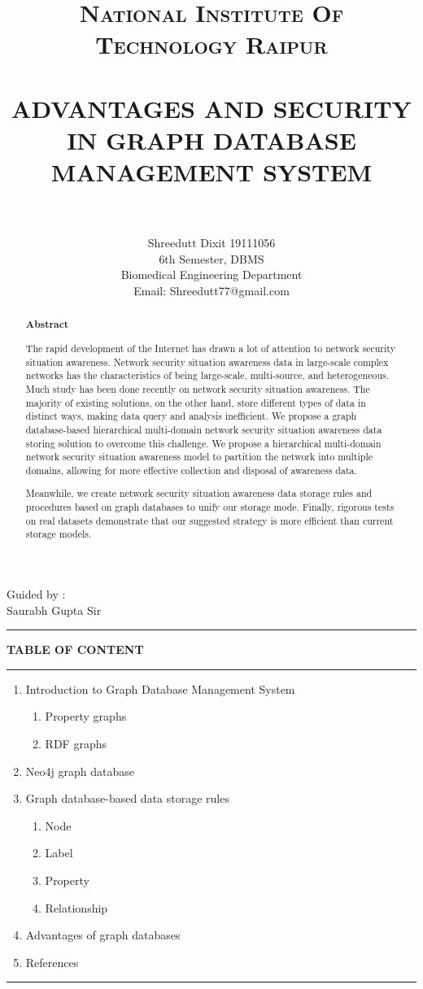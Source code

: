\documentclass[paper=a4, fontsize=11pt]{scrartcl}
\title{
		\usefont{OT1}{bch}{b}{n}
		\normalfont \normalsize \textsc{National Institute Of Technology Raipur} \\ [25pt]
		\horrule{0.5pt} \\[0.4cm]
		\huge ADVANTAGES AND SECURITY IN GRAPH DATABASE MANAGEMENT SYSTEM  \\
		\horrule{2pt} \\[0.5cm]
}
\author{
        Shreedutt Dixit 19111056\\6th Semester, 
        DBMS\\ Biomedical Engineering Department\\	
        Email: Shreedutt77@gmail.com
        \normalsize
}
\date{}
\numberwithin{equation}{section}		%
\numberwithin{figure}{section}			%
\numberwithin{table}{section}				%
\begin{document}
\maketitle
\begin{flushright}
    Guided by :\\
    Saurabh Gupta Sir
\end{flushright}

\noindent\rule{\textwidth}{1pt}
\begin{abstract}
    \begin{center}
        \Large{\textbf{Abstract}}\\
    \end{center}
    \Large { The rapid development of the Internet has drawn a lot of attention to network security situation awareness. Network security situation awareness data in large-scale complex networks has the characteristics of being large-scale, multi-source, and heterogeneous. Much study has been done recently on network security situation awareness. The majority of existing solutions, on the other hand, store different types of data in distinct ways, making data query and analysis inefficient.
    \newpage 
    We propose a graph database-based hierarchical multi-domain network security situation awareness data storing solution to overcome this challenge. We propose a hierarchical multi-domain network security situation awareness model to partition the network into multiple domains, allowing for more effective collection and disposal of awareness data.
    
    Meanwhile, we create network security situation awareness data storage rules and procedures based on graph databases to unify our storage mode. Finally, rigorous tests on real datasets demonstrate that our suggested strategy is more efficient than current storage models.}
\end{abstract}


\newpage
\textbf{TABLE OF CONTENT}\\
\rule{\textwidth}{1pt}
\begin{enumerate}
    \item Introduction to Graph Database Management System
    \begin{enumerate}
        \item Property graphs
        \item RDF graphs
    \end{enumerate}
    \item Neo4j graph database
    \item Graph database-based data storage rules
    \begin{enumerate}
        \item Node
        \item Label
        \item Property
        \item Relationship
    \end{enumerate}
    \item Advantages of graph databases
    \item References
\end{enumerate}
\rule{\textwidth}{1pt}
\newpage
\Large
\end{document}
